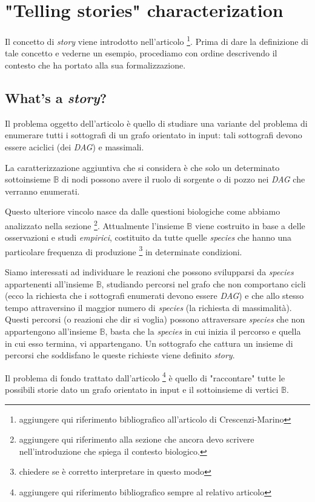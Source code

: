 \section{"Telling stories" characterization}
Il concetto di \emph{story} viene introdotto nell'articolo
\footnote{aggiungere qui riferimento bibliografico all'articolo di
  Crescenzi-Marino}. Prima di dare la definizione di tale concetto e
vederne un esempio, procediamo con ordine descrivendo il contesto che
ha portato alla sua formalizzazione.

\subsection{What's a \emph{story}?}
\label{subsection:whats-a-story}
Il problema oggetto dell'articolo \`e quello di studiare una variante
del problema di enumerare tutti i sottografi di un grafo orientato in
input: tali sottografi devono essere aciclici (dei \emph{DAG}) e
massimali.

La caratterizzazione aggiuntiva che si considera \`e che solo un
determinato sottoinsieme $\mathbb{B}$ di nodi possono avere il ruolo
di sorgente o di pozzo nei \emph{DAG} che verranno enumerati. 

Questo ulteriore vincolo nasce da dalle questioni biologiche come
abbiamo analizzato nella sezione \footnote{aggiungere qui riferimento
  alla sezione che ancora devo scrivere nell'introduzione che spiega
  il contesto biologico.}. Attualmente l'insieme $\mathbb{B}$ viene
costruito in base a delle osservazioni e studi \emph{empirici},
costituito da tutte quelle \emph{species} che hanno una particolare
frequenza di produzione \footnote{chiedere se \`e corretto
  interpretare in questo modo} in determinate condizioni.

Siamo interessati ad individuare le reazioni che possono svilupparsi
da \emph{species} appartenenti all'insieme $\mathbb{B}$, studiando
percorsi nel grafo che non comportano cicli (ecco la richiesta che i
sottografi enumerati devono essere \emph{DAG}) e che allo stesso tempo
attraversino il maggior numero di \emph{species} (la richiesta di
massimalit\`a). Questi percorsi (o reazioni che dir si voglia) possono
attraversare \emph{species} che non appartengono all'insieme
$\mathbb{B}$, basta che la \emph{species} in cui inizia il percorso e
quella in cui esso termina, vi appartengano. Un sottografo che cattura
un insieme di percorsi che soddisfano le queste richieste viene
definito \emph{story}.

Il problema di fondo trattato dall'articolo \footnote{aggiungere qui
  riferimento bibliografico sempre al relativo articolo} \`e quello di
"raccontare" tutte le possibili storie dato un grafo orientato in
input e il sottoinsieme di vertici $\mathbb{B}$.

